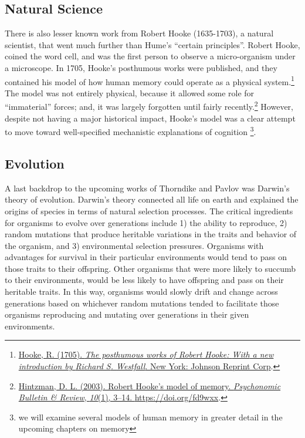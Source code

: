 \documentclass[
  oneside,
  12pt]{crumpbook}
\begin{document}
\hypertarget{natural-science}{%
\subsection{Natural Science}\label{natural-science}}

There is also lesser known work from Robert Hooke (1635-1703), a natural scientist, that went much further than Hume's ``certain principles''. Robert Hooke, coined the word cell, and was the first person to observe a micro-organism under a microscope. In 1705, Hooke's posthumous works were published, and they contained his model of how human memory could operate as a physical system.\footnote{\protect\hyperlink{ref-hookePosthumousWorksRobert1705}{Hooke, R. (1705). \emph{The posthumous works of {Robert Hooke}: {With} a new introduction by {Richard S}. {Westfall}}. {New York: Johnson Reprint Corp}}.} The model was not entirely physical, because it allowed some role for ``immaterial'' forces; and, it was largely forgotten until fairly recently.\footnote{\protect\hyperlink{ref-hintzmanRobertHookeModel2003}{Hintzman, D. L. (2003). Robert {Hooke}'s model of memory. \emph{Psychonomic Bulletin \& Review}, \emph{10}(1), 3--14. \url{https://doi.org/fd9wxx}}.} However, despite not having a major historical impact, Hooke's model was a clear attempt to move toward well-specified mechanistic explanations of cognition \footnote{we will examine several models of human memory in greater detail in the upcoming chapters on memory}.

\hypertarget{evolution}{%
\subsection{Evolution}\label{evolution}}

A last backdrop to the upcoming works of Thorndike and Pavlov was Darwin's theory of evolution. Darwin's theory connected all life on earth and explained the origins of species in terms of natural selection processes. The critical ingredients for organisms to evolve over generations include 1) the ability to reproduce, 2) random mutations that produce heritable variations in the traits and behavior of the organism, and 3) environmental selection pressures. Organisms with advantages for survival in their particular environments would tend to pass on those traits to their offspring. Other organisms that were more likely to succumb to their environments, would be less likely to have offspring and pass on their heritable traits. In this way, organisms would slowly drift and change across generations based on whichever random mutations tended to facilitate those organisms reproducing and mutating over generations in their given environments.
\end{document}
